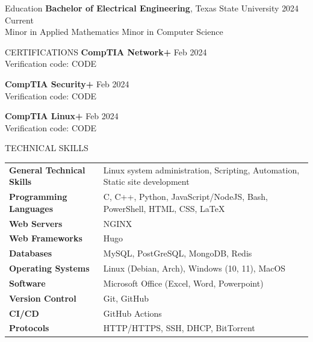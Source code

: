 \documentclass{resume} %
\begin{document}

\begin{rSection}{Education}
{\bf Bachelor of Electrical Engineering}, Texas State University \hfill {2024 Current}\\
Minor in Applied Mathematics \smallskip
Minor in Computer Science
\end{rSection}

\begin{rSection}{CERTIFICATIONS}
{\bf CompTIA Network+} \hfill {Feb 2024} \\
Verification code: CODE

{\bf CompTIA Security+} \hfill {Feb 2024} \\
Verification code: CODE

{\bf CompTIA Linux+} \hfill {Feb 2024} \\
Verification code: CODE
\end{rSection}

\begin{rSection}{TECHNICAL SKILLS}
\begin{tabular}{ @{} >{\bfseries}l @{\hspace{6ex}} l }
    General Technical Skills & Linux system administration, Scripting, Automation, Static site development \\
    Programming Languages & C, C++, Python, JavaScript/NodeJS, Bash, PowerShell, HTML, CSS, LaTeX \\
    Web Servers & NGINX \\ 
    Web Frameworks & Hugo \\
    Databases & MySQL, PostGreSQL, MongoDB, Redis \\
    Operating Systems & Linux (Debian, Arch), Windows (10, 11), MacOS \\
    Software & Microsoft Office (Excel, Word, Powerpoint) \\ 
    Version Control & Git, GitHub \\
    CI/CD & GitHub Actions \\
    Protocols & HTTP/HTTPS, SSH, DHCP, BitTorrent \\
\end{tabular}
\end{rSection}
\end{document}
